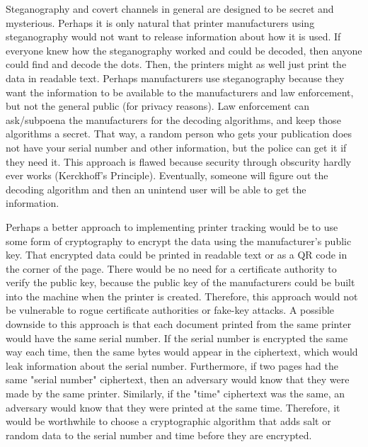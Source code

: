 	Steganography and covert channels in general are designed to be secret and mysterious. Perhaps it is only natural that printer manufacturers using steganography would not want to release information about how it is used. If everyone knew how the steganography worked and could be decoded, then anyone could find and decode the dots. Then, the printers might as well just print the data in readable text. Perhaps manufacturers use steganography because they want the information to be available to the manufacturers and law enforcement, but not the general public (for privacy reasons). Law enforcement can ask/subpoena the manufacturers for the decoding algorithms, and keep those algorithms a secret. That way, a random person who gets your publication does not have your serial number and other information, but the police can get it if they need it. This approach is flawed because security through obscurity hardly ever works (Kerckhoff's Principle). Eventually, someone will figure out the decoding algorithm and then an unintend user will be able to get the information.

	Perhaps a better approach to implementing printer tracking would be to use some form of cryptography to encrypt the data using the manufacturer's public key. That encrypted data could be printed in readable text or as a QR code in the corner of the page. There would be no need for a certificate authority to verify the public key, because the public key of the manufacturers could be built into the machine when the printer is created. Therefore, this approach would not be vulnerable to rogue certificate authorities or fake-key attacks. A possible downside to this approach is that each document printed from the same printer would have the same serial number. If the serial number is encrypted the same way each time, then the same bytes would appear in the ciphertext, which would leak information about the serial number. Furthermore, if two pages had the same "serial number" ciphertext, then an adversary would know that they were made by the same printer. Similarly, if the "time" ciphertext was the same, an adversary would know that they were printed at the same time. Therefore, it would be worthwhile to choose a cryptographic algorithm that adds salt or random data to the serial number and time before they are encrypted.

